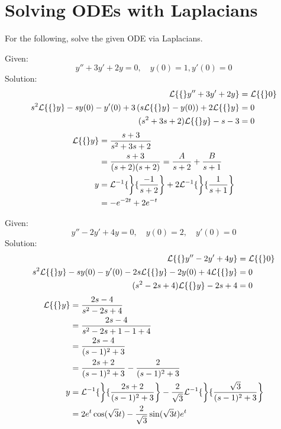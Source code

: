 \documentclass[diffeq.tex]{subfiles}
\begin{document}
\section{Solving ODEs with Laplacians}
For the following, solve the given ODE via Laplacians.
\begin{homework*}[255.9]
    Given:
    \begin{equation}
        y'' + 3y' + 2y = 0,\quad y(0) = 1, y'(0) = 0
    \end{equation}
    Solution:
    \begin{alignat}{1}
        \mathcal{L}\{\{\}y'' + 3y' + 2y\} &= \mathcal{L}\{\{\}0\}\\
        s^{2}\mathcal{L}\{\{\}y\} - sy(0) - y'(0) + 3\left(s\mathcal{L}\{\{\}y\} - y(0)\right) + 2\mathcal{L}\{\{\}y\} &= 0\\
        (s^{2} + 3s + 2)\mathcal{L}\{\{\}y\} - s - 3 &= 0\\
    \end{alignat}
    \begin{alignat}{1}
        \mathcal{L}\{\{\}y\} &= \frac{s + 3}{s^{2} + 3s + 2}\\
        &= \frac{s + 3}{(s + 2)(s + 2)} = \frac{A}{s + 2} + \frac{B}{s + 1}\\
        y &= \mathcal{L}^{-1}\{\left\}\{\frac{-1}{s+2}\right\} + 2 \mathcal{L}^{-1}\{\left\}\{\frac{1}{s + 1}\right\}\\
        &= -e^{-2t} + 2e^{-t}
    \end{alignat}
\end{homework*}
\begin{homework*}[255.11]
    Given:
    \begin{equation}
        y'' - 2y' + 4y = 0,\quad y(0) = 2,\quad y'(0) = 0
    \end{equation}
    Solution:
    \begin{alignat}{1}
        \mathcal{L}\{\{\}y'' - 2y' + 4y\} &= \mathcal{L}\{\{\}0\}\\
        s^{2}\mathcal{L}\{\{\}y\} - sy(0) - y'(0) - 2s\mathcal{L}\{\{\}y\} - 2y(0) + 4\mathcal{L}\{\{\}y\} &= 0\\
        (s^{2} - 2s + 4)\mathcal{L}\{\{\}y\} - 2s + 4 &= 0
    \end{alignat}
    \begin{alignat}{1}
        \mathcal{L}\{\{\}y\} &= \frac{2s - 4}{s^{2} - 2s + 4}\\
        &= \frac{2s - 4}{s^{2} -2s + 1 - 1 + 4}\\
        &= \frac{2s - 4}{(s - 1)^{2} + 3}\\
        &= \frac{2s + 2}{(s - 1)^{2} + 3} - \frac{2}{(s - 1)^{2} + 3}\\
        y &= \mathcal{L}^{-1}\{\left\}\{\frac{2s + 2}{(s - 1)^{2} + 3}\right\} - \frac{2}{\sqrt{3}}\mathcal{L}^{-1}\{\left\}\{\frac{\sqrt{3}}{(s - 1)^{2} + 3}\right\}\\
        &= 2e^{t}\cos(\sqrt{3}t) - \frac{2}{\sqrt{3}}\sin(\sqrt{3}t)e^{t}
    \end{alignat}
\end{homework*}
\end{document}
